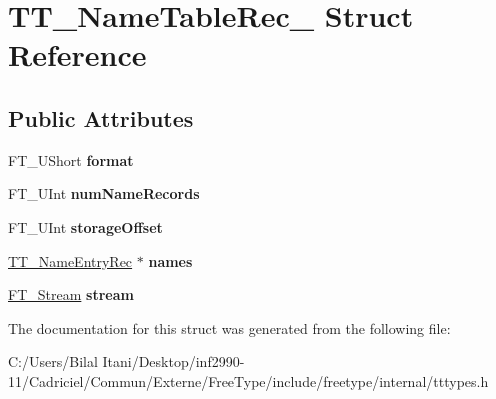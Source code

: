 \hypertarget{struct_t_t___name_table_rec__}{}\section{T\+T\+\_\+\+Name\+Table\+Rec\+\_\+ Struct Reference}
\label{struct_t_t___name_table_rec__}
\subsection*{Public Attributes}
\begin{DoxyCompactItemize}
\item 
F\+T\+\_\+\+U\+Short {\bfseries format}\hypertarget{struct_t_t___name_table_rec___a762c5431cbe285cb7153bb5650710fb0}{}\label{struct_t_t___name_table_rec___a762c5431cbe285cb7153bb5650710fb0}

\item 
F\+T\+\_\+\+U\+Int {\bfseries num\+Name\+Records}\hypertarget{struct_t_t___name_table_rec___a5b565d940b9d02bb69cd19da5cda61b8}{}\label{struct_t_t___name_table_rec___a5b565d940b9d02bb69cd19da5cda61b8}

\item 
F\+T\+\_\+\+U\+Int {\bfseries storage\+Offset}\hypertarget{struct_t_t___name_table_rec___a4ed1f4e78e39b2e206411e9ea4d23801}{}\label{struct_t_t___name_table_rec___a4ed1f4e78e39b2e206411e9ea4d23801}

\item 
\hyperlink{struct_t_t___name_entry_rec__}{T\+T\+\_\+\+Name\+Entry\+Rec} $\ast$ {\bfseries names}\hypertarget{struct_t_t___name_table_rec___a693aed17954386eb8fb5fd7f69d5b551}{}\label{struct_t_t___name_table_rec___a693aed17954386eb8fb5fd7f69d5b551}

\item 
\hyperlink{struct_f_t___stream_rec__}{F\+T\+\_\+\+Stream} {\bfseries stream}\hypertarget{struct_t_t___name_table_rec___a97109aec8cd7ca13f6627f3fee15d48d}{}\label{struct_t_t___name_table_rec___a97109aec8cd7ca13f6627f3fee15d48d}

\end{DoxyCompactItemize}


The documentation for this struct was generated from the following file\+:\begin{DoxyCompactItemize}
\item 
C\+:/\+Users/\+Bilal Itani/\+Desktop/inf2990-\/11/\+Cadriciel/\+Commun/\+Externe/\+Free\+Type/include/freetype/internal/tttypes.\+h\end{DoxyCompactItemize}
